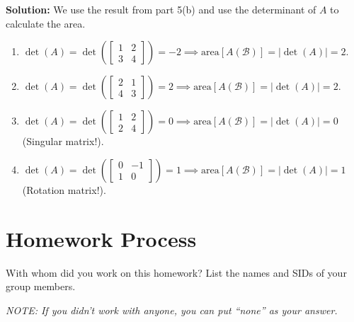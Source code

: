 \documentclass[10pt]{article}
\theoremstyle{definition}
\theoremstyle{plain}
\begin{document}
\begin{enumerate}[label=(\alph*)]
\textbf{Solution:} We use the result from part 5(b) and use the determinant of $A$ to calculate the area.
\begin{enumerate}[label=\roman*.]
\item $\det(A) = \det\!\left(\begin{bmatrix} 1 & 2 \\ 3 & 4 \end{bmatrix}\right) = -2 \implies \text{area}[A(\mathcal{B})] = |\det(A)| = 2$.
\item $\det(A) = \det\!\left(\begin{bmatrix} 2 & 1 \\ 4 & 3 \end{bmatrix}\right) = 2 \implies \text{area}[A(\mathcal{B})] = |\det(A)| = 2$.
\item $\det(A) = \det\!\left(\begin{bmatrix} 1 & 2 \\ 2 & 4 \end{bmatrix}\right) = 0 \implies \text{area}[A(\mathcal{B})] = |\det(A)| = 0$ (Singular matrix!).
\item $\det(A) = \det\!\left(\begin{bmatrix} 0 & -1 \\ 1 & 0 \end{bmatrix}\right) = 1 \implies \text{area}[A(\mathcal{B})] = |\det(A)| = 1$ (Rotation matrix!).
\end{enumerate}
\end{enumerate}

\section{Homework Process}

With whom did you work on this homework? List the names and SIDs of your group members.

\textit{NOTE: If you didn't work with anyone, you can put ``none'' as your answer.}
\end{document}
